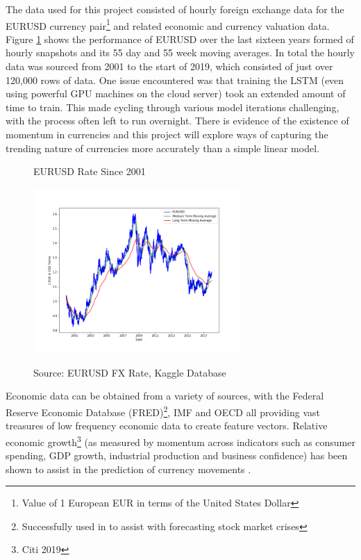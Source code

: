\documentclass[11pt]{article}
\begin{document}
The data used for this project consisted of hourly foreign exchange data for the EURUSD currency pair\footnote{Value of 1 European EUR in terms of the United States Dollar} and related economic and currency valuation data. Figure \ref{fig:EURUSDMovingAvg} shows the performance of EURUSD over the last sixteen years formed of hourly snapshots and its 55 day and 55 week moving averages. In total the hourly data was sourced from 2001 to the start of 2019, which consisted of just over 120,000 rows of data. One issue encountered was that training the LSTM (even using powerful GPU machines on the cloud server) took an extended amount of time to train. This made cycling through various model iterations challenging, with the process often left to run overnight.  There is evidence of the existence of momentum in currencies \cite{Filippou2017} and this project will explore ways of capturing the trending nature of currencies more accurately than a simple linear model.
\begin{figure}[h]
    \centering
	\caption{EURUSD Rate Since 2001}
    \includegraphics[width=0.7\textwidth]{EURUSDMovingAvg}   
    \label{fig:EURUSDMovingAvg}
\caption*{\small Source: EURUSD FX Rate, Kaggle Database}
\end{figure}
Economic data can be obtained from a variety of sources, with the Federal Reserve Economic Database (FRED)\footnote{Successfully used in \cite{Chatzis2018} to assist with forecasting stock market crises}, IMF and OECD all providing vast treasures of low frequency economic data to create feature vectors. Relative economic growth\footnote{Citi 2019} (as measured by momentum across indicators such as consumer spending, GDP growth, industrial production and business confidence) has been shown to assist in the prediction of currency movements \cite{Dahlquist2015}. 
\end{document}
